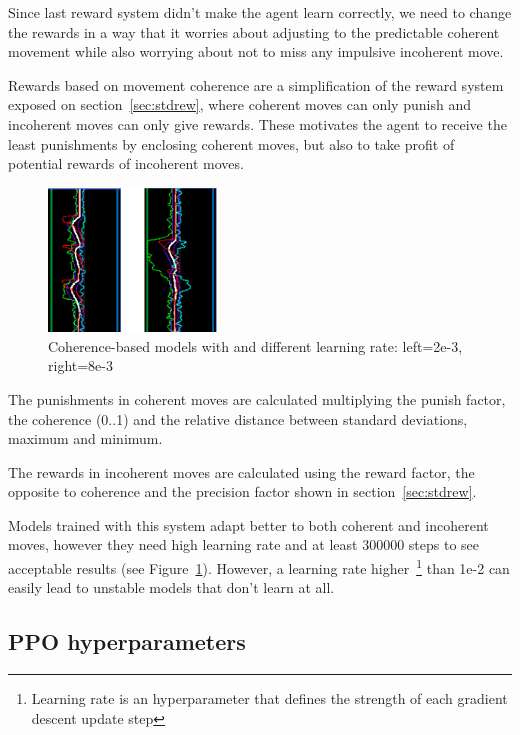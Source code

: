 Since last reward system didn't make the agent learn correctly, we need to change the rewards in a way that it worries about adjusting to the predictable coherent movement while also worrying about not to miss any impulsive incoherent move.

Rewards based on movement coherence are a simplification of the reward system exposed on section~\ref{sec:stdrew}, where coherent moves can only punish and incoherent moves can only give rewards. These motivates the agent to receive the least punishments by enclosing coherent moves, but also to take profit of potential rewards of incoherent moves. 

\begin{figure}
    \centering
    \includegraphics[width=0.4\textwidth]{img/graphsCoherence.png}
		\caption{Coherence-based models with and different learning rate: left=2e-3, right=8e-3}
		\label{fig:precisionR}
\end{figure}

The punishments in coherent moves are calculated multiplying the punish factor, the coherence (0..1) and the relative distance between standard deviations, maximum and minimum.

The rewards in incoherent moves are calculated using the reward factor, the opposite to coherence and the precision factor shown in section~\ref{sec:stdrew}.

Models trained with this system adapt better to both coherent and incoherent moves, however they need high learning rate and at least 300000 steps to see acceptable results (see Figure~\ref{fig:precisionR}). However, a learning rate higher~\footnote{Learning rate is an hyperparameter that defines the strength of each gradient descent update step} than 1e-2 can easily lead to unstable models that don't learn at all.

\subsection{PPO hyperparameters}

